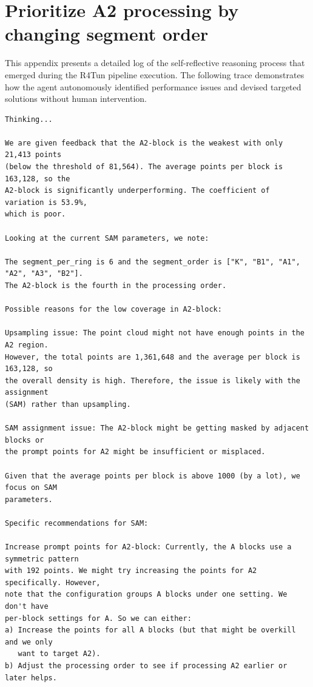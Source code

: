 \section{Prioritize A2 processing by changing segment order}\label{app:emergent_behaviors}

This appendix presents a detailed log of the self-reflective reasoning process that emerged during the R4Tun pipeline execution. The following trace demonstrates how the agent autonomously identified performance issues and devised targeted solutions without human intervention.

\begin{lstlisting}[breaklines=true, basicstyle=\footnotesize\ttfamily, frame=single]
Thinking...

We are given feedback that the A2-block is the weakest with only 21,413 points 
(below the threshold of 81,564). The average points per block is 163,128, so the 
A2-block is significantly underperforming. The coefficient of variation is 53.9%, 
which is poor.

Looking at the current SAM parameters, we note:

The segment_per_ring is 6 and the segment_order is ["K", "B1", "A1", "A2", "A3", "B2"].
The A2-block is the fourth in the processing order.

Possible reasons for the low coverage in A2-block:

Upsampling issue: The point cloud might not have enough points in the A2 region. 
However, the total points are 1,361,648 and the average per block is 163,128, so 
the overall density is high. Therefore, the issue is likely with the assignment 
(SAM) rather than upsampling.

SAM assignment issue: The A2-block might be getting masked by adjacent blocks or 
the prompt points for A2 might be insufficient or misplaced.

Given that the average points per block is above 1000 (by a lot), we focus on SAM 
parameters.

Specific recommendations for SAM:

Increase prompt points for A2-block: Currently, the A blocks use a symmetric pattern 
with 192 points. We might try increasing the points for A2 specifically. However, 
note that the configuration groups A blocks under one setting. We don't have 
per-block settings for A. So we can either:
a) Increase the points for all A blocks (but that might be overkill and we only 
   want to target A2).
b) Adjust the processing order to see if processing A2 earlier or later helps.


\end{lstlisting}
